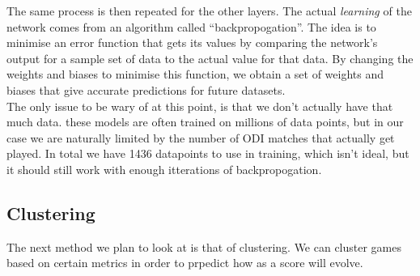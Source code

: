 \documentclass[11pt]{amsart}
\begin{document}
The same process is then repeated for the other layers. The actual \textit{learning} of the network comes from an algorithm called ``backpropogation''.
The idea is to minimise an error function that gets its values by comparing the network's output for a sample set of data to the actual value for that data. By changing 
the weights and biases to minimise this function, we obtain a set of weights and biases that give accurate predictions for future datasets. \\

The only issue to be wary of at this point, is that we don't actually have that much data. these models are often trained on millions of data points, but in our case we are naturally 
limited by the number of ODI matches that actually get played. In total we have 1436 datapoints to use in training, which isn't ideal, but it should still work with enough itterations of backpropogation.

\subsection{Clustering}
The next method we plan to look at is that of clustering. We can cluster games based on certain metrics in order to prpedict how as a score will evolve.


{}

\end{document}
